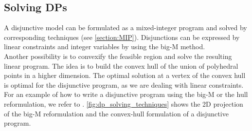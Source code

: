 \subsection*{Solving DPs} %
\label{section:solving_dps}
A disjunctive model can be formulated as a mixed-integer program and solved by corresponding techniques (see \cref{section:MIP}). Disjunctions can be expressed by linear constraints and integer variables by using the big-M method. \\
Another possibility is to convexify the feasible region and solve the resulting linear program. The idea is to build the convex hull of the union of polyhedral points in a higher dimension. The optimal solution at a vertex of the convex hull is optimal for the disjunctive program, as we are dealing with linear constraints. %
For an example of how to write a disjunctive program using the big-M or the hull reformulation, we refer to \cite{perez_disjunctiveprogrammingjl_2023}.
\cref{fig:dp_solving_techniques} shows the 2D projection of the big-M reformulation and the convex-hull formulation of a disjunctive program. \newpage

